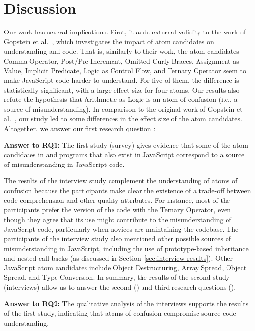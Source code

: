 \section{Discussion}
\label{sec:discussion}

Our work has several implications.
First, it adds external validity to the
work of Gopstein et al.~\cite{DBLP:conf/sigsoft/GopsteinIYDZYC17},
which investigates
the impact of atom candidates on
understanding \clang and \cpplang code. That is,
similarly to their work, the atom candidates
Comma Operator, Post/Pre Increment, Omitted Curly Braces,
Assignment as Value, Implicit Predicate, Logic as
Control Flow, and Ternary Operator seem to make 
JavaScript code harder to understand. For five of them, the difference is statistically significant, with a large effect size for four atoms. Our results also 
refute the hypothesis that Arithmetic as Logic is an atom of confusion (i.e., a source of misunderstanding).
In comparison to the original
work of Gopstein et al.~\cite{DBLP:conf/sigsoft/GopsteinIYDZYC17}, 
our study
led to some differences in the effect size
of the atom candidates.
Altogether, we answer our first research question
\emph{\rqa}:

\begin{mh}
  {\bf Answer to RQ1:} The first study (survey) gives evidence that some of the atom candidates in \clang and \cpplang programs that also exist in JavaScript correspond to a source of misunderstanding in
  JavaScript code. 
\end{mh}

The results of the interview study complement the understanding of atoms of confusion because the participants make clear the existence of a trade-off between code comprehension and other quality attributes. For instance, most of the participants prefer the version of the code with the Ternary Operator, even though they agree that its use might contribute to the misunderstanding of JavaScript code, particularly when novices are maintaining the codebase. The participants of the interview study also
mentioned other possible sources of misunderstanding in JavaScript,
including the use of prototype-based inheritance and nested call-backs (as discussed in Section~\ref{sec:interview-results}). Other JavaScript atom candidates include
Object Destructuring, Array Spread, Object Spread, and Type Conversion.
In summary, the results of the second study (interviews) allow
us to answer the second (\rqb) and third research questions
(\emph{\rqc}).

\begin{mh}
  {\bf Answer to RQ2:} The qualitative analysis of the
  interviews supports the results of the first study,
  indicating that atoms of confusion compromise
  source code understanding. 
\end{mh}

